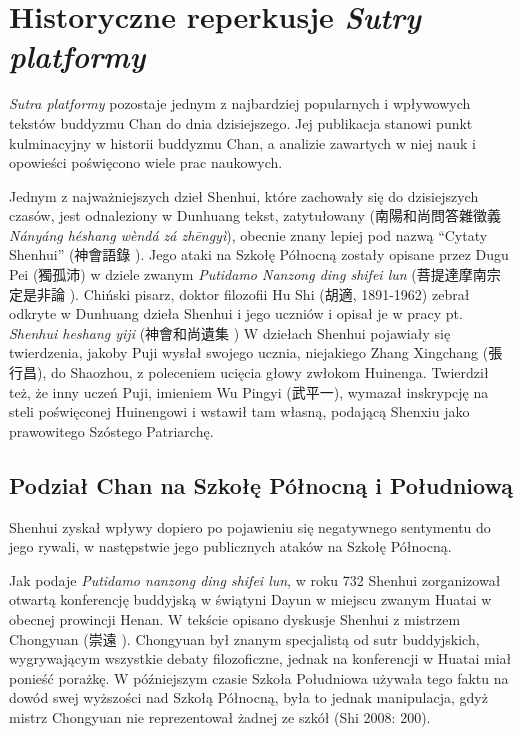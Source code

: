 \chapter{Historyczne reperkusje \textit{Sutry platformy}}
\textit{Sutra platformy} pozostaje jednym z najbardziej popularnych i wpływowych tekstów buddyzmu Chan do dnia dzisiejszego. Jej publikacja stanowi punkt kulminacyjny w historii buddyzmu Chan, a analizie zawartych w niej nauk i opowieści poświęcono wiele prac naukowych.

Jednym z najważniejszych dzieł Shenhui, które zachowały się do dzisiejszych czasów, jest odnaleziony w Dunhuang tekst, zatytułowany  (南陽和尚問答雜徵義 \textit{Nányáng héshang wèndá zá zhēngyì}), obecnie znany lepiej pod nazwą ``Cytaty Shenhui'' (神會語錄 ).
Jego ataki na Szkołę Północną zostały opisane przez Dugu Pei (獨孤沛) w dziele zwanym \textit{Putidamo Nanzong ding shifei lun} (菩提達摩南宗定是非論 ).
Chiński pisarz, doktor filozofii Hu Shi (胡適, 1891-1962) zebrał odkryte w Dunhuang dzieła Shenhui i jego uczniów i opisał je w pracy pt. \textit{Shenhui heshang yiji} (神會和尚遺集 )
W dziełach Shenhui pojawiały się twierdzenia, jakoby Puji wysłał swojego ucznia, niejakiego Zhang Xingchang (張行昌), do Shaozhou, z poleceniem ucięcia głowy zwłokom Huinenga.
Twierdził też, że inny uczeń Puji, imieniem Wu Pingyi (武平一), wymazał inskrypcję na steli poświęconej Huinengowi i wstawił tam własną, podającą Shenxiu jako prawowitego Szóstego Patriarchę.
\fi

\section{Podział Chan na Szkołę Północną i Południową}
Shenhui zyskał wpływy dopiero po pojawieniu się negatywnego sentymentu do jego rywali, w następstwie jego publicznych ataków na Szkołę Północną.

Jak podaje \textit{Putidamo nanzong ding shifei lun}, w roku 732 Shenhui zorganizował otwartą konferencję buddyjską w świątyni Dayun w miejscu zwanym Huatai w obecnej prowincji Henan.\label{Huatai}
W tekście opisano dyskusje Shenhui z mistrzem Chongyuan (崇遠 ).
Chongyuan był znanym specjalistą od sutr buddyjskich, wygrywającym wszystkie debaty filozoficzne, jednak na konferencji w Huatai miał ponieść porażkę.
W późniejszym czasie Szkoła Południowa używała tego faktu na dowód swej wyższości nad Szkołą Północną, była to jednak manipulacja, gdyż mistrz Chongyuan nie reprezentował żadnej ze szkół
(Shi 2008: 200).

